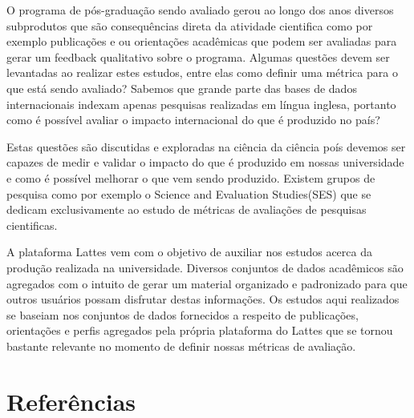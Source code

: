 \documentclass[]{article}
\begin{document}
O programa de pós-graduação sendo avaliado gerou ao longo dos anos
diversos subprodutos que são consequências direta da atividade
cientifica como por exemplo publicações e ou orientações acadêmicas que
podem ser avaliadas para gerar um feedback qualitativo sobre o programa.
Algumas questões devem ser levantadas ao realizar estes estudos, entre
elas como definir uma métrica para o que está sendo avaliado? Sabemos
que grande parte das bases de dados internacionais indexam apenas
pesquisas realizadas em língua inglesa, portanto como é possível avaliar
o impacto internacional do que é produzido no país?

Estas questões são discutidas e exploradas na ciência da ciência poís
devemos ser capazes de medir e validar o impacto do que é produzido em
nossas universidade e como é possível melhorar o que vem sendo
produzido. Existem grupos de pesquisa como por exemplo o Science and
Evaluation Studies(SES) que se dedicam exclusivamente ao estudo de
métricas de avaliações de pesquisas cientificas.

A plataforma Lattes vem com o objetivo de auxiliar nos estudos acerca da
produção realizada na universidade. Diversos conjuntos de dados
acadêmicos são agregados com o intuito de gerar um material organizado e
padronizado para que outros usuários possam disfrutar destas
informações. Os estudos aqui realizados se baseiam nos conjuntos de
dados fornecidos a respeito de publicações, orientações e perfis
agregados pela própria plataforma do Lattes que se tornou bastante
relevante no momento de definir nossas métricas de avaliação.

\section{Referências}\label{referencias}
\end{document}
